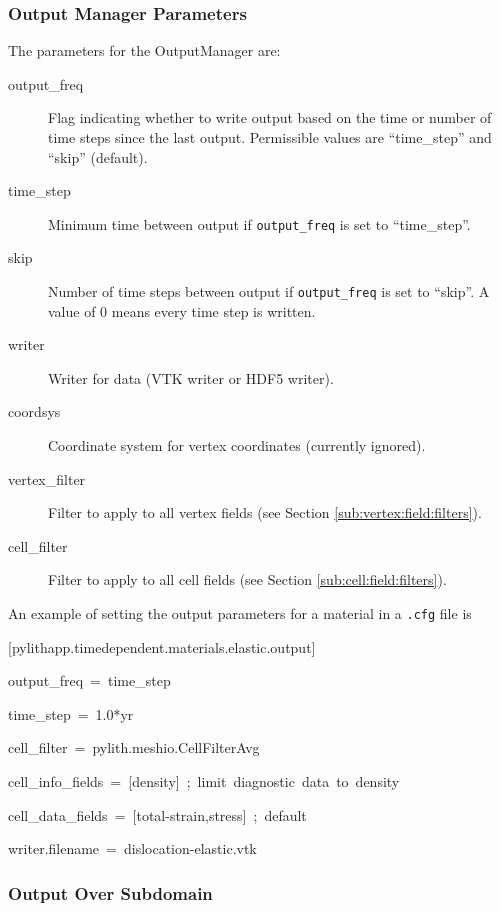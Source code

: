 \subsubsection{Output Manager Parameters}

The parameters for the OutputManager are:
\begin{description}
\item [{output\_freq}] Flag indicating whether to write output based on
the time or number of time steps since the last output. Permissible
values are ``time\_step'' and ``skip'' (default).
\item [{time\_step}] Minimum time between output if \texttt{output\_freq}
is set to ``time\_step''.
\item [{skip}] Number of time steps between output if \texttt{output\_freq}
is set to ``skip''. A value of 0 means every time step is written.
\item [{writer}] Writer for data (VTK writer or HDF5 writer).
\item [{coordsys}] Coordinate system for vertex coordinates (currently
ignored).
\item [{vertex\_filter}] Filter to apply to all vertex fields (see Section
\ref{sub:vertex:field:filters}).
\item [{cell\_filter}] Filter to apply to all cell fields (see Section
\ref{sub:cell:field:filters}).
\end{description}
An example of setting the output parameters for a material in a \texttt{.cfg}
file is
\begin{lyxcode}
{[}pylithapp.timedependent.materials.elastic.output{]}

output\_freq~=~time\_step

time\_step~=~1.0{*}yr

cell\_filter~=~pylith.meshio.CellFilterAvg

cell\_info\_fields~=~{[}density{]}~;~limit~diagnostic~data~to~density

cell\_data\_fields~=~{[}total-strain,stress{]}~;~default

writer.filename~=~dislocation-elastic.vtk
\end{lyxcode}

\subsubsection{Output Over Subdomain}

